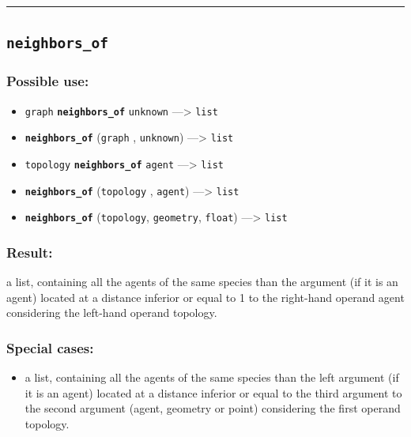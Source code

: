 \documentclass[]{book}
\providecommand{\tightlist}{%
  \setlength{\itemsep}{0pt}\setlength{\parskip}{0pt}}
\theoremstyle{definition}
\theoremstyle{definition}
\theoremstyle{definition}
\theoremstyle{remark}
\begin{document}
\begin{center}\rule{0.5\linewidth}{\linethickness}\end{center}

\subsection{\texorpdfstring{\texttt{neighbors\_of}}{neighbors\_of}}\label{neighbors_of}

\subsubsection{Possible use:}\label{possible-use-367}

\begin{itemize}
\tightlist
\item
  \texttt{graph} \textbf{\texttt{neighbors\_of}} \texttt{unknown}
  ---\textgreater{} \texttt{list}
\item
  \textbf{\texttt{neighbors\_of}} (\texttt{graph} , \texttt{unknown})
  ---\textgreater{} \texttt{list}
\item
  \texttt{topology} \textbf{\texttt{neighbors\_of}} \texttt{agent}
  ---\textgreater{} \texttt{list}
\item
  \textbf{\texttt{neighbors\_of}} (\texttt{topology} , \texttt{agent})
  ---\textgreater{} \texttt{list}
\item
  \textbf{\texttt{neighbors\_of}} (\texttt{topology}, \texttt{geometry},
  \texttt{float}) ---\textgreater{} \texttt{list}
\end{itemize}

\subsubsection{Result:}\label{result-355}

a list, containing all the agents of the same species than the argument
(if it is an agent) located at a distance inferior or equal to 1 to the
right-hand operand agent considering the left-hand operand topology.

\subsubsection{Special cases:}\label{special-cases-103}

\begin{itemize}
\tightlist
\item
  a list, containing all the agents of the same species than the left
  argument (if it is an agent) located at a distance inferior or equal
  to the third argument to the second argument (agent, geometry or
  point) considering the first operand topology.
\end{itemize}
\end{document}
